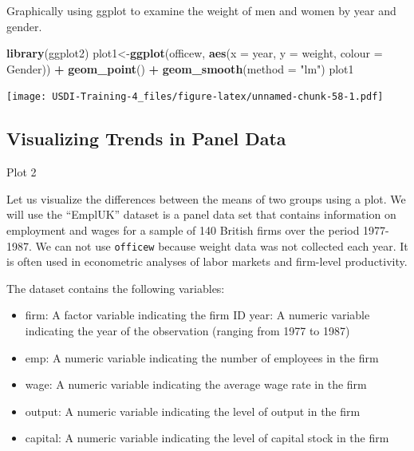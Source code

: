 \documentclass[
]{article}
\newenvironment{Shaded}{\begin{snugshade}}{\end{snugshade}}
\newcommand{\AttributeTok}[1]{\textcolor[rgb]{0.13,0.29,0.53}{#1}}
\newcommand{\FunctionTok}[1]{\textcolor[rgb]{0.13,0.29,0.53}{\textbf{#1}}}
\newcommand{\NormalTok}[1]{#1}
\newcommand{\OtherTok}[1]{\textcolor[rgb]{0.56,0.35,0.01}{#1}}
\newcommand{\SpecialCharTok}[1]{\textcolor[rgb]{0.81,0.36,0.00}{\textbf{#1}}}
\newcommand{\StringTok}[1]{\textcolor[rgb]{0.31,0.60,0.02}{#1}}
\providecommand{\tightlist}{%
  \setlength{\itemsep}{0pt}\setlength{\parskip}{0pt}}
\begin{document}
Graphically using ggplot to examine the weight of men and women by year
and gender.

\begin{Shaded}
\begin{Highlighting}[]
\FunctionTok{library}\NormalTok{(ggplot2)}
\NormalTok{plot1}\OtherTok{\textless{}{-}}\FunctionTok{ggplot}\NormalTok{(officew, }\FunctionTok{aes}\NormalTok{(}\AttributeTok{x =}\NormalTok{ year, }\AttributeTok{y =}\NormalTok{ weight, }\AttributeTok{colour =}\NormalTok{ Gender)) }\SpecialCharTok{+}
  \FunctionTok{geom\_point}\NormalTok{() }\SpecialCharTok{+}
  \FunctionTok{geom\_smooth}\NormalTok{(}\AttributeTok{method =} \StringTok{"lm"}\NormalTok{)}
\NormalTok{plot1}
\end{Highlighting}
\end{Shaded}

\texttt{[image: USDI-Training-4\_files/figure-latex/unnamed-chunk-58-1.pdf]}

\pagebreak

\hypertarget{visualizing-trends-in-panel-data}{%
\subsection{Visualizing Trends in Panel
Data}\label{visualizing-trends-in-panel-data}}

Plot 2

Let us visualize the differences between the means of two groups using a
plot. We will use the ``EmplUK'' dataset is a panel data set that
contains information on employment and wages for a sample of 140 British
firms over the period 1977-1987. We can not use \texttt{officew} because
weight data was not collected each year. It is often used in econometric
analyses of labor markets and firm-level productivity.

The dataset contains the following variables:

\begin{itemize}
\tightlist
\item
  firm: A factor variable indicating the firm ID year: A numeric
  variable indicating the year of the observation (ranging from 1977 to
  1987)
\item
  emp: A numeric variable indicating the number of employees in the firm
\item
  wage: A numeric variable indicating the average wage rate in the firm
\item
  output: A numeric variable indicating the level of output in the firm
\item
  capital: A numeric variable indicating the level of capital stock in
  the firm
\end{itemize}
\end{document}
